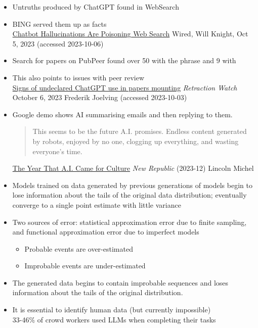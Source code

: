 \documentclass[25pt,a4paper,landscape,headrule,footrule,xetex]{foils}
\begin{document}
\begin{itemize}
\item Untruths produced by ChatGPT found in WebSearch
\item BING served them up as facts
  \\ {\small \href{https://www.wired.com/story/fast-forward-chatbot-hallucinations-are-poisoning-web-search/}{Chatbot Hallucinations Are Poisoning Web Search} Wired, Will Knight, Oct 5, 2023 (accessed 2023-10-06)}
\item Search for papers on PubPeer found over 50 with the phrase  and 9 with 
\item This also points to issues with peer review
  \\{\small 
\href{https://retractionwatch.com/2023/10/06/signs-of-undeclared-chatgpt-use-in-papers-mounting/}{Signs of undeclared ChatGPT use in papers mounting} \textit{Retraction Watch} October 6, 2023 Frederik Joelving (accessed 2023-10-03)}

\newpage 


\item Google demo shows AI summarising emails and then replying to them.
  \begin{quote}
    This seems to be the future A.I. promises. Endless content generated by robots, enjoyed by no one, clogging up everything, and wasting everyone’s time.
  \end{quote}
  {\small
    \href{https://newrepublic.com/article/177197/year-ai-came-culture}{The Year That A.I. Came for Culture}
\textit{New Republic} (2023-12) Lincoln Michel }


\end{itemize}


\begin{itemize}\addtolength{\itemsep}{-1ex}
\item Models trained on data generated by previous generations of
  models begin to lose information about the tails of the original
  data distribution;  eventually converge to a single point estimate
  with little variance
\item Two sources of error: statistical
  approximation error due to finite sampling, and functional
  approximation error due to imperfect models
  \begin{itemize}
  \item  Probable events are over-estimated 
  \item Improbable events are under-estimated 
  \end{itemize}
\item The generated data begins to contain improbable sequences and
  loses information about the tails of the original distribution.
\item It is essential to identify human data (but currently impossible)
  \\ 33-46\% of crowd workers used LLMs when completing their tasks
\end{itemize}
\end{document}
